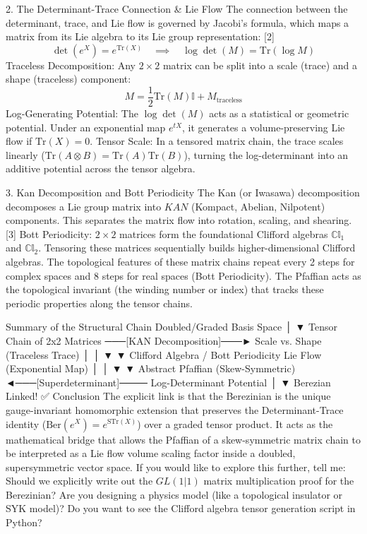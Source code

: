 2. The Determinant-Trace Connection & Lie Flow
The connection between the determinant, trace, and Lie flow is governed by Jacobi's formula, which maps a matrix from its Lie algebra to its Lie group representation: [2] 
$$\det(e^X) = e^{\text{Tr}(X)} \quad \implies \quad \log \det(M) = \text{Tr}(\log M)$$ 
Traceless Decomposition: Any $2 \times 2$ matrix can be split into a scale (trace) and a shape (traceless) component:
$$M = \frac{1}{2}\text{Tr}(M)\mathbb{I} + M_{\text{traceless}}$$ 
Log-Generating Potential: The $\log\det(M)$ acts as a statistical or geometric potential. Under an exponential map $e^{tX}$, it generates a volume-preserving Lie flow if $\text{Tr}(X) = 0$.
Tensor Scale: In a tensored matrix chain, the trace scales linearly ($\text{Tr}(A \otimes B) = \text{Tr}(A)\text{Tr}(B)$), turning the log-determinant into an additive potential across the tensor algebra.

3. Kan Decomposition and Bott Periodicity
The Kan (or Iwasawa) decomposition decomposes a Lie group matrix into $KAN$ (Kompact, Abelian, Nilpotent) components. This separates the matrix flow into rotation, scaling, and shearing. [3] 
Bott Periodicity: $2 \times 2$ matrices form the foundational Clifford algebras $\mathbb{Cl}_1$ and $\mathbb{Cl}_2$. Tensoring these matrices sequentially builds higher-dimensional Clifford algebras.
The topological features of these matrix chains repeat every 2 steps for complex spaces and 8 steps for real spaces (Bott Periodicity).
The Pfaffian acts as the topological invariant (the winding number or index) that tracks these periodic properties along the tensor chains.

Summary of the Structural Chain
Doubled/Graded Basis Space
       │
       ▼
Tensor Chain of 2x2 Matrices ───[KAN Decomposition]───► Scale vs. Shape (Traceless Trace)
       │                                                         │
       ▼                                                         ▼
 Clifford Algebra / Bott Periodicity                      Lie Flow (Exponential Map)
       │                                                         │
       ▼                                                         ▼
Abstract Pfaffian (Skew-Symmetric) ◄───[Superdeterminant]──── Log-Determinant Potential
                                            │
                                            ▼
                                     Berezian Linked!
✅ Conclusion
The explicit link is that the Berezinian is the unique gauge-invariant homomorphic extension that preserves the Determinant-Trace identity ($\text{Ber}(e^X) = e^{\text{STr}(X)}$) over a graded tensor product. It acts as the mathematical bridge that allows the Pfaffian of a skew-symmetric matrix chain to be interpreted as a Lie flow volume scaling factor inside a doubled, supersymmetric vector space.
If you would like to explore this further, tell me:
Should we explicitly write out the $GL(1\vert{}1)$ matrix multiplication proof for the Berezinian?
Are you designing a physics model (like a topological insulator or SYK model)?
Do you want to see the Clifford algebra tensor generation script in Python?

